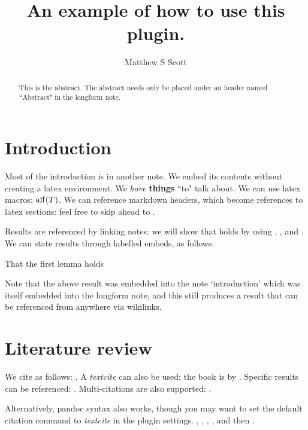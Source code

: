 \documentclass{article}
\title{An example of how to use this plugin.}
\author{Matthew S Scott}
\begin{document}
\maketitle
\begin{abstract}
This is the abstract. The abstract needs only be placed under an header named ``Abstract" in the longform note.
\end{abstract}
\section{Introduction}
\label{loc:body.introduction}
Most of the introduction is in another note. We embed its contents without creating a latex environment.
We \emph{have} \textbf{things} ``to" talk about. We can use latex macros: $\operatorname{aff}(T)$. We can reference markdown headers, which become references to latex sections: feel free to skip ahead to .

Results are referenced by linking notes: we will show that  holds by using , ,  and . We can state results through labelled embeds, as follows. 
\begin{lemma}
\label{loc:other_small_lemmas.second_other_lemma}
That the first lemma holds
\end{lemma}
Note that the above result was embedded into the note `introduction' which was itself embedded into the longform note, and this still produces a result that can be referenced from anywhere via wikilinks.
\section{Literature review}
\label{loc:body.literature_review}
We cite as follows: \cite{vershyninHighDimensionalProbabilityIntroduction2018}. A \emph{textcite} can also be used: the book is by \textcite{vershyninHighDimensionalProbabilityIntroduction2018}. Specific results can be referenced: \cite[Example 5.4]{vershyninHighDimensionalProbabilityIntroduction2018}. Multi-citations are also supported: \cite{berkCoherenceParameterCharacterizing2022, berkModeladaptedFourierSampling2023}.

Alternatively, pandoc syntax also works, though you may want to set the default citation command to \emph{textcite} in the plugin settings. \textcite{vershyninHighDimensionalProbabilityIntroduction2018}, \citeyear{vershyninHighDimensionalProbabilityIntroduction2018}, \textcite[Example 2.1]{vershyninHighDimensionalProbabilityIntroduction2018}, \cite{berkCoherenceParameterCharacterizing2022, berkModeladaptedFourierSampling2023}, 
\parencite{berkCoherenceParameterCharacterizing2022, berkModeladaptedFourierSampling2023} and then \parencite{vershyninHighDimensionalProbabilityIntroduction2018}.
\end{document}
